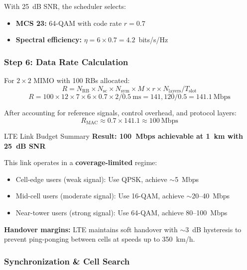 With 25~dB SNR, the scheduler selects:
\begin{itemize}
\item \textbf{MCS 23:} 64-QAM with code rate $r = 0.7$
\item \textbf{Spectral efficiency:} $\eta = 6 \times 0.7 = 4.2$~bits/s/Hz
\end{itemize}

\subsubsection*{Step 6: Data Rate Calculation}

For $2 \times 2$ MIMO with 100 RBs allocated:
\begin{equation}
R = N_{\text{RB}} \times N_{\text{sc}} \times N_{\text{sym}} \times M \times r \times N_{\text{layers}} / T_{\text{slot}}
\end{equation}
\begin{equation}
R = 100 \times 12 \times 7 \times 6 \times 0.7 \times 2 / 0.5~\text{ms} = 141,120 / 0.5 = 141.1~\text{Mbps}
\end{equation}

After accounting for reference signals, control overhead, and protocol layers:
\begin{equation}
R_{\text{MAC}} \approx 0.7 \times 141.1 \approx 100~\text{Mbps}
\end{equation}

\begin{calloutbox}{LTE Link Budget Summary}
\textbf{Result: 100~Mbps achievable at 1~km with 25~dB SNR}

This link operates in a \textbf{coverage-limited} regime:
\begin{itemize}
\item Cell-edge users (weak signal): Use QPSK, achieve $\sim$5~Mbps
\item Mid-cell users (moderate signal): Use 16-QAM, achieve $\sim$20--40~Mbps
\item Near-tower users (strong signal): Use 64-QAM, achieve 80--100~Mbps
\end{itemize}

\textbf{Handover margins:} LTE maintains soft handover with $\sim$3~dB hysteresis to prevent ping-ponging between cells at speeds up to 350~km/h.
\end{calloutbox}

\subsubsection{Synchronization \& Cell
Search}\label{synchronization-cell-search}

